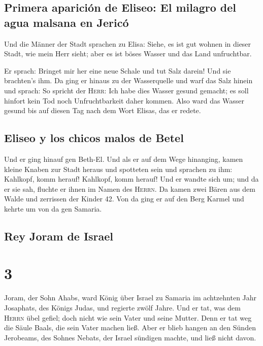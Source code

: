 \hypertarget{primera-apariciuxf3n-de-eliseo-el-milagro-del-agua-malsana-en-jericuxf3}{%
\subsection{Primera aparición de Eliseo: El milagro del agua malsana en
Jericó}\label{primera-apariciuxf3n-de-eliseo-el-milagro-del-agua-malsana-en-jericuxf3}}

 Und die Männer der Stadt sprachen zu Elisa: Siehe, es
ist gut wohnen in dieser Stadt, wie mein Herr sieht; aber es ist böses
Wasser und das Land unfruchtbar.

 Er sprach: Bringet mir her eine neue Schale und tut Salz
darein! Und sie brachten's ihm.  Da ging er hinaus zu der
Wasserquelle und warf das Salz hinein und sprach: So spricht der
\textsc{Herr}: Ich habe dies Wasser gesund gemacht; es soll hinfort kein
Tod noch Unfruchtbarkeit daher kommen.  Also ward das
Wasser gesund bis auf diesen Tag nach dem Wort Elisas, das er redete.

\hypertarget{eliseo-y-los-chicos-malos-de-betel}{%
\subsection{Eliseo y los chicos malos de
Betel}\label{eliseo-y-los-chicos-malos-de-betel}}

 Und er ging hinauf gen Beth-El. Und als er auf dem Wege
hinanging, kamen kleine Knaben zur Stadt heraus und spotteten sein und
sprachen zu ihm: Kahlkopf, komm herauf! Kahlkopf, komm herauf!
 Und er wandte sich um; und da er sie sah, fluchte er
ihnen im Namen des \textsc{Herrn}. Da kamen zwei Bären aus dem Walde und
zerrissen der Kinder 42.  Von da ging er auf den Berg
Karmel und kehrte um von da gen Samaria.

\hypertarget{rey-joram-de-israel}{%
\subsection{Rey Joram de Israel}\label{rey-joram-de-israel}}

\hypertarget{section-2}{%
\section{3}\label{section-2}}

 Joram, der Sohn Ahabs, ward König über Israel zu Samaria
im achtzehnten Jahr Josaphats, des Königs Judas, und regierte zwölf
Jahre.  Und er tat, was dem \textsc{Herrn} übel gefiel;
doch nicht wie sein Vater und seine Mutter. Denn er tat weg die Säule
Baals, die sein Vater machen ließ.  Aber er blieb hangen
an den Sünden Jerobeams, des Sohnes Nebats, der Israel sündigen machte,
und ließ nicht davon.

